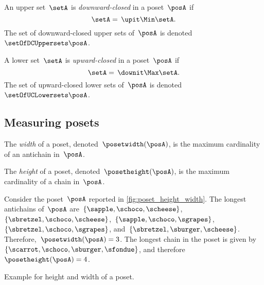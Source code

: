 \begin{definition}
	\label{def:downward-closed-upperset}
	An upper set~$\setA$ is \emph{downward-closed} in a poset~$\posA$ if
	\begin{equation}
		\setA =\, \upit  \Min \setA.
	\end{equation}
	The set of downward-closed upper sets of~$\posA$ is denoted~$\setOfDCUppersets \posA$.

\end{definition}

\begin{definition}
	\label{def:upward-closed-lowerset}
	A lower set~$\setA$ is \emph{upward-closed} in a poset~$\posA$ if
	\begin{equation}
		\setA =\, \downit  \Max \setA.
	\end{equation}
	The set of upward-closed lower sets of~$\posA$ is denoted~$\setOfUCLowersets \posA$.

\end{definition}

\subsection{Measuring posets}
\begin{definition}
	\label{def:poset-width}
	The \emph{width} of a poset, denoted~$\posetwidth(\posA)$, is the maximum cardinality of an antichain in~$\posA$.
\end{definition}

\begin{definition}
	\label{def:poset-height}
	The \emph{height} of a poset, denoted~$\posetheight(\posA)$, is the maximum cardinality of a chain in~$\posA$.
\end{definition}

\begin{example}
	Consider the poset~$\posA$ reported in \cref{fig:poset_height_width}.
	The longest antichains of~$\posA$ are~$\{\sapple, \schoco, \scheese\}$,~$\{\sbretzel, \schoco, \scheese\}$,~$\{\sapple, \schoco, \sgrapes\}$,~$\{\sbretzel, \schoco, \sgrapes\}$, and~$\{\sbretzel, \sburger, \scheese\}$.
	Therefore,~$\posetwidth(\posA)=3$.
	The longest chain in the poset is given by~$\{\scarrot,\schoco,\sburger,\sfondue\}$, and therefore~$\posetheight(\posA)=4$.

	\begin{marginfigure}
		\caption{Example for height and width of a poset.}
	\end{marginfigure}
\end{example}

